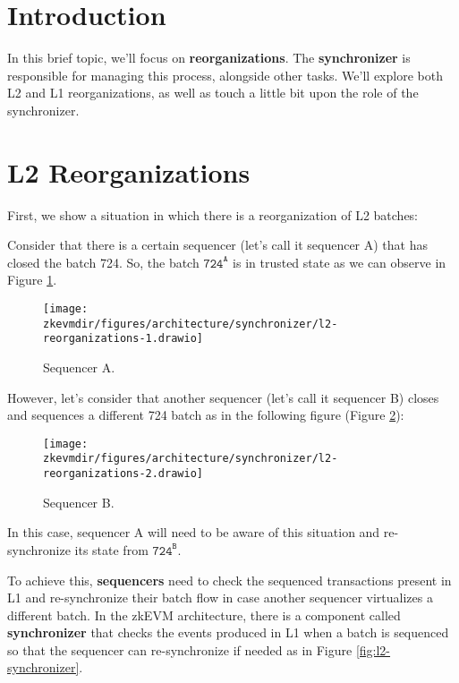 


\section{Introduction}

In this brief topic, we'll focus on \textbf{reorganizations}. The \textbf{synchronizer} is responsible for managing this process, alongside other tasks. We'll explore both L2 and L1 reorganizations, as well as touch a little bit upon the role of the synchronizer.


\section{L2 Reorganizations}

First, we show a situation in which there is a reorganization of L2 batches:

Consider that there is a certain sequencer (let's call it sequencer A) that has closed the batch 724. So, the batch $\mathtt{724^A}$ is in trusted state as we can observe in Figure \ref{fig:l2-reorganizations-1}.
\begin{figure}[H]
\centering
\texttt{[image: \\zkevmdir/figures/architecture/synchronizer/l2-reorganizations-1.drawio]}
\caption{Sequencer A.}
\label{fig:l2-reorganizations-1}
\end{figure}

However, let's consider that another sequencer (let's call it sequencer B) closes and sequences a different 724 batch as in the following figure (Figure \ref{fig:l2-reorganizations-2}):
\begin{figure}[H]
\centering
\texttt{[image: \\zkevmdir/figures/architecture/synchronizer/l2-reorganizations-2.drawio]}
\caption{Sequencer B.}
\label{fig:l2-reorganizations-2}
\end{figure}

In this case, sequencer A will need to be aware of this situation and re-synchronize its state from $\mathtt{724^B}$. 

To achieve this, \textbf{sequencers} need to check the sequenced transactions present in L1 and re-synchronize their batch flow in case another sequencer virtualizes a different batch. In the zkEVM architecture, there is a component called \textbf{synchronizer} that checks the events produced in L1 when a batch is sequenced so that the sequencer can re-synchronize if needed as in Figure \ref{fig:l2-synchronizer}.

